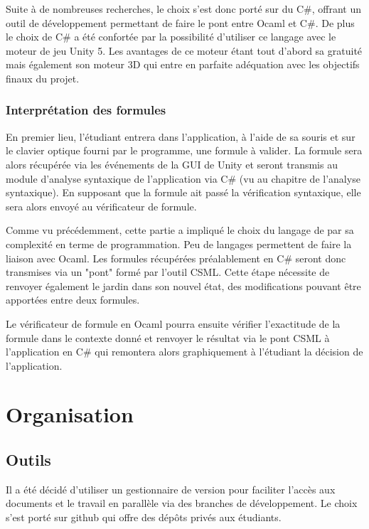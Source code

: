 \documentclass{article}
\theoremstyle{plain}
\theoremstyle{remark}
\begin{document}
Suite à de nombreuses recherches, le choix s'est donc porté sur du
C\#, offrant un outil de développement permettant de faire le pont
entre Ocaml et C\#.  De plus le choix de C\# a été confortée par la
possibilité d'utiliser ce langage avec le moteur de jeu Unity 5.  Les
avantages de ce moteur étant tout d'abord sa gratuité mais également
son moteur 3D qui entre en parfaite adéquation avec les objectifs
finaux du projet.

\subsubsection{Interprétation des formules}
En premier lieu, l'étudiant entrera dans l'application, à l'aide de sa
souris et sur le clavier optique fourni par le programme, une formule
à valider.  La formule sera alors récupérée via les événements de la
GUI de Unity et seront transmis au module d'analyse syntaxique de
l'application via C\# (vu au chapitre de l'analyse syntaxique). En
supposant que la formule ait passé la vérification syntaxique, elle
sera alors envoyé au vérificateur de formule.

Comme vu précédemment, cette partie a impliqué le choix du langage de
par sa complexité en terme de programmation. Peu de langages
permettent de faire la liaison avec Ocaml. Les formules récupérées
préalablement en C\# seront donc transmises via un "pont" formé par
l'outil CSML. Cette étape nécessite de renvoyer également le jardin
dans son nouvel état, des modifications pouvant être apportées entre
deux formules.

Le vérificateur de formule en Ocaml pourra ensuite vérifier
l'exactitude de la formule dans le contexte donné et renvoyer le
résultat via le pont CSML à l'application en C\# qui remontera alors
graphiquement à l'étudiant la décision de l'application.


\section{Organisation}
\subsection{Outils}
Il a été décidé d'utiliser un gestionnaire de version pour faciliter
l'accès aux documents et le travail en parallèle via des branches de
développement.  Le choix s'est porté sur github qui offre des dépôts
privés aux étudiants.
\end{document}
